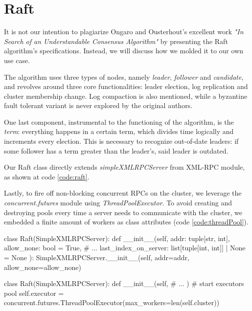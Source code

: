 \section{Raft} \label{sec:raft}

It is not our intention to plagiarize Ongaro and Ousterhout's excellent work \textit{"In Search of an Understandable Consensus Algorithm"} \cite{raft} by presenting the Raft algorithm's specifications. Instead, we will discuss how we molded it to our own use case.

The algorithm uses three types of nodes, namely \textit{leader}, \textit{follower} and \textit{candidate}, and revolves around three core functionalities: leader election, log replication and cluster membership change. Log compaction is also mentioned, while a byzantine fault tolerant variant is never explored by the original authors.

One last component, instrumental to the functioning of the algorithm, is the \textit{term}: everything happens in a certain term, which divides time logically and increments every election. This is necessary to recognize out-of-date leaders: if some follower has a term greater than the leader's, said leader is outdated. 

Our Raft class directly extends \textit{simpleXMLRPCServer} from XML-RPC module, as shown at code \ref{code:raft}.

Lastly, to fire off non-blocking concurrent RPCs on the cluster, we leverage the \textit{concurrent.futures} module using \textit{ThreadPoolExecutor}. To avoid creating and destroying pools every time a server needs to communicate with the cluster, we embedded a finite amount of workers as class attributes (code \ref{code:threadPool}).

\begin{python}[label={code:raft}, caption={Class Raft definition}]
class Raft(SimpleXMLRPCServer):
    def __init__(self, 
                 addr: tuple[str, int],
                 allow_none: bool = True,
                 # ...
                 last_index_on_server: list[tuple[int, int]] | None = None
                 ):
        SimpleXMLRPCServer.__init__(self, addr=addr, allow_none=allow_none)
\end{python}

\begin{python}[label={code:threadPool}, caption={ThreadPoolExecutor created with as many workers as there are servers in the cluster}]
class Raft(SimpleXMLRPCServer):
    def __init__(self, 
                 # ...
                 )
        # start executors pool
        self.executor = concurrent.futures.ThreadPoolExecutor(max_workers=len(self.cluster))
\end{python}


